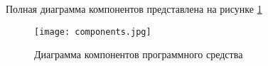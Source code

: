 Полная диаграмма компонентов представлена на рисунке \ref{fig:arch_and_mod::components}


\begin{figure}[!htb]
  \centering
  \texttt{[image: components.jpg]}
  \caption{ Диаграмма компонентов программного средства }
  \label{fig:arch_and_mod::components}
\end{figure}


